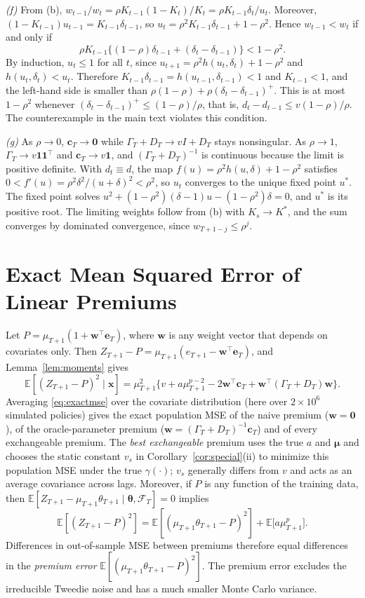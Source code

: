 \documentclass[mathematics,article,submit,moreauthors]{Definitions/mdpi}
\newcommand{\E}{\mathbb{E}}
\newcommand{\bmu}{\boldsymbol{\mu}}
\newcommand{\be}{\boldsymbol{e}}
\newcommand{\bc}{\boldsymbol{c}}
\newcommand{\bw}{\boldsymbol{w}}
\newcommand{\bx}{\boldsymbol{x}}
\newcommand{\bone}{\mathbf{1}}
\begin{document}
\emph{(f)} From (b), $w_{t-1}/w_t=\rho K_{t-1}(1-K_t)/K_t=\rho K_{t-1}\delta_t/u_t$. Moreover, $(1-K_{t-1})u_{t-1}=K_{t-1}\delta_{t-1}$, so $u_t=\rho^2K_{t-1}\delta_{t-1}+1-\rho^2$. Hence $w_{t-1}<w_t$ if and only if
\[
\rho K_{t-1}\{(1-\rho)\delta_{t-1}+(\delta_t-\delta_{t-1})\}<1-\rho^2 .
\]
By induction, $u_t\le1$ for all $t$, since $u_{t+1}=\rho^2h(u_t,\delta_t)+1-\rho^2$ and $h(u_t,\delta_t)<u_t$. Therefore $K_{t-1}\delta_{t-1}=h(u_{t-1},\delta_{t-1})<1$ and $K_{t-1}<1$, and the left-hand side is smaller than $\rho(1-\rho)+\rho(\delta_t-\delta_{t-1})^+$. This is at most $1-\rho^2$ whenever $(\delta_t-\delta_{t-1})^+\le(1-\rho)/\rho$, that is, $d_t-d_{t-1}\le v(1-\rho)/\rho$. The counterexample in the main text violates this condition.

\emph{(g)} As $\rho\to0$, $\bc_T\to\boldsymbol0$ while $\Gamma_T+D_T\to vI+D_T$ stays nonsingular. As $\rho\to1$, $\Gamma_T\to v\bone\bone^\top$ and $\bc_T\to v\bone$, and $(\Gamma_T+D_T)^{-1}$ is continuous because the limit is positive definite. With $d_t\equiv d$, the map $f(u)=\rho^2h(u,\delta)+1-\rho^2$ satisfies $0<f'(u)=\rho^2\delta^2/(u+\delta)^2<\rho^2$, so $u_t$ converges to the unique fixed point $u^\ast$. The fixed point solves $u^2+(1-\rho^2)(\delta-1)u-(1-\rho^2)\delta=0$, and $u^\ast$ is its positive root. The limiting weights follow from (b) with $K_s\to K^\ast$, and the sum converges by dominated convergence, since $w_{T+1-j}\le\rho^j$.

\section{Exact Mean Squared Error of Linear Premiums}\label{app:mse}

Let $P=\mu_{T+1}(1+\bw^\top\be_T)$, where $\bw$ is any weight vector that depends on covariates only. Then $Z_{T+1}-P=\mu_{T+1}(e_{T+1}-\bw^\top\be_T)$, and Lemma~\ref{lem:moments} gives
\begin{equation}\label{eq:exactmse}
\E[(Z_{T+1}-P)^2\mid\bx]=\mu_{T+1}^2\big\{v+a\mu_{T+1}^{p-2}-2\bw^\top\bc_T+\bw^\top(\Gamma_T+D_T)\bw\big\}.
\end{equation}
Averaging \eqref{eq:exactmse} over the covariate distribution (here over $2\times10^6$ simulated policies) gives the exact population MSE of the naive premium ($\bw=\boldsymbol0$), of the oracle-parameter premium ($\bw=(\Gamma_T+D_T)^{-1}\bc_T$) and of every exchangeable premium. The \emph{best exchangeable} premium uses the true $a$ and $\bmu$ and chooses the static constant $v_s$ in Corollary~\ref{cor:special}(ii) to minimize this population MSE under the true $\gamma(\cdot)$; $v_s$ generally differs from $v$ and acts as an average covariance across lags. Moreover, if $P$ is any function of the training data, then $\E[Z_{T+1}-\mu_{T+1}\theta_{T+1}\mid\boldsymbol\theta,\mathcal{F}_T]=0$ implies
\[
\E[(Z_{T+1}-P)^2]=\E[(\mu_{T+1}\theta_{T+1}-P)^2]+\E\big[a\mu_{T+1}^{p}\big].
\]
Differences in out-of-sample MSE between premiums therefore equal differences in the \emph{premium error} $\E[(\mu_{T+1}\theta_{T+1}-P)^2]$. The premium error excludes the irreducible Tweedie noise and has a much smaller Monte Carlo variance.
\end{document}
